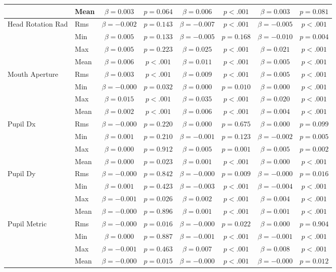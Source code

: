 \begin{tabular}{llcc|cc|cc}
 & Mean & $\beta = 0.003$ & $p = 0.064$ & $\beta = 0.006$ & $p < .001$ & $\beta = 0.003$ & $p = 0.081$ \\
\midrule
\multirow{4}{*}{Head Rotation Rad} & Rms & $\beta = -0.002$ & $p = 0.143$ & $\beta = -0.007$ & $p < .001$ & $\beta = -0.005$ & $p < .001$ \\
 & Min & $\beta = 0.005$ & $p = 0.133$ & $\beta = -0.005$ & $p = 0.168$ & $\beta = -0.010$ & $p = 0.004$ \\
 & Max & $\beta = 0.005$ & $p = 0.223$ & $\beta = 0.025$ & $p < .001$ & $\beta = 0.021$ & $p < .001$ \\
 & Mean & $\beta = 0.006$ & $p < .001$ & $\beta = 0.011$ & $p < .001$ & $\beta = 0.005$ & $p < .001$ \\
\midrule
\multirow{4}{*}{Mouth Aperture} & Rms & $\beta = 0.003$ & $p < .001$ & $\beta = 0.009$ & $p < .001$ & $\beta = 0.005$ & $p < .001$ \\
 & Min & $\beta = -0.000$ & $p = 0.032$ & $\beta = 0.000$ & $p = 0.010$ & $\beta = 0.000$ & $p < .001$ \\
 & Max & $\beta = 0.015$ & $p < .001$ & $\beta = 0.035$ & $p < .001$ & $\beta = 0.020$ & $p < .001$ \\
 & Mean & $\beta = 0.002$ & $p < .001$ & $\beta = 0.006$ & $p < .001$ & $\beta = 0.004$ & $p < .001$ \\
\midrule
\multirow{4}{*}{Pupil Dx} & Rms & $\beta = -0.000$ & $p = 0.220$ & $\beta = 0.000$ & $p = 0.675$ & $\beta = 0.000$ & $p = 0.099$ \\
 & Min & $\beta = 0.001$ & $p = 0.210$ & $\beta = -0.001$ & $p = 0.123$ & $\beta = -0.002$ & $p = 0.005$ \\
 & Max & $\beta = 0.000$ & $p = 0.912$ & $\beta = 0.005$ & $p = 0.001$ & $\beta = 0.005$ & $p = 0.002$ \\
 & Mean & $\beta = 0.000$ & $p = 0.023$ & $\beta = 0.001$ & $p < .001$ & $\beta = 0.000$ & $p < .001$ \\
\midrule
\multirow{4}{*}{Pupil Dy} & Rms & $\beta = -0.000$ & $p = 0.842$ & $\beta = -0.000$ & $p = 0.009$ & $\beta = -0.000$ & $p = 0.016$ \\
 & Min & $\beta = 0.001$ & $p = 0.423$ & $\beta = -0.003$ & $p < .001$ & $\beta = -0.004$ & $p < .001$ \\
 & Max & $\beta = -0.001$ & $p = 0.026$ & $\beta = 0.002$ & $p < .001$ & $\beta = 0.004$ & $p < .001$ \\
 & Mean & $\beta = -0.000$ & $p = 0.896$ & $\beta = 0.001$ & $p < .001$ & $\beta = 0.001$ & $p < .001$ \\
\midrule
\multirow{4}{*}{Pupil Metric} & Rms & $\beta = -0.000$ & $p = 0.016$ & $\beta = -0.000$ & $p = 0.022$ & $\beta = 0.000$ & $p = 0.904$ \\
 & Min & $\beta = 0.000$ & $p = 0.887$ & $\beta = -0.001$ & $p < .001$ & $\beta = -0.001$ & $p < .001$ \\
 & Max & $\beta = -0.001$ & $p = 0.463$ & $\beta = 0.007$ & $p < .001$ & $\beta = 0.008$ & $p < .001$ \\
 & Mean & $\beta = -0.000$ & $p = 0.015$ & $\beta = -0.000$ & $p < .001$ & $\beta = -0.000$ & $p = 0.012$ \\
\midrule
\bottomrule
\end{tabular}